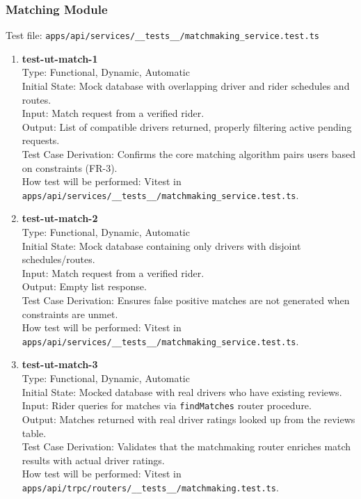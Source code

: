 \documentclass[12pt, titlepage]{article}
\begin{document}
\subsubsection{Matching Module}

Test file: \texttt{apps/api/services/\_\_tests\_\_/matchmaking\_service.test.ts}

\begin{enumerate}
\item \textbf{test-ut-match-1}\\
Type: Functional, Dynamic, Automatic\\
Initial State: Mock database with overlapping driver and rider schedules and routes.\\
Input: Match request from a verified rider.\\
Output: List of compatible drivers returned, properly filtering active pending requests.\\
Test Case Derivation: Confirms the core matching algorithm pairs users based on constraints (FR-3).\\
How test will be performed: Vitest in \texttt{apps/api/services/\_\_tests\_\_/matchmaking\_service.test.ts}.\\

\item \textbf{test-ut-match-2}\\
Type: Functional, Dynamic, Automatic\\
Initial State: Mock database containing only drivers with disjoint schedules/routes.\\
Input: Match request from a verified rider.\\
Output: Empty list response.\\
Test Case Derivation: Ensures false positive matches are not generated when constraints are unmet.\\
How test will be performed: Vitest in \texttt{apps/api/services/\_\_tests\_\_/matchmaking\_service.test.ts}.\\

\item \textbf{test-ut-match-3}\\
Type: Functional, Dynamic, Automatic\\
Initial State: Mocked database with real drivers who have existing reviews.\\
Input: Rider queries for matches via \texttt{findMatches} router procedure.\\
Output: Matches returned with real driver ratings looked up from the reviews table.\\
Test Case Derivation: Validates that the matchmaking router enriches match results with actual driver ratings.\\
How test will be performed: Vitest in \texttt{apps/api/trpc/routers/\_\_tests\_\_/matchmaking.test.ts}.\\


\end{enumerate}
\end{document}
